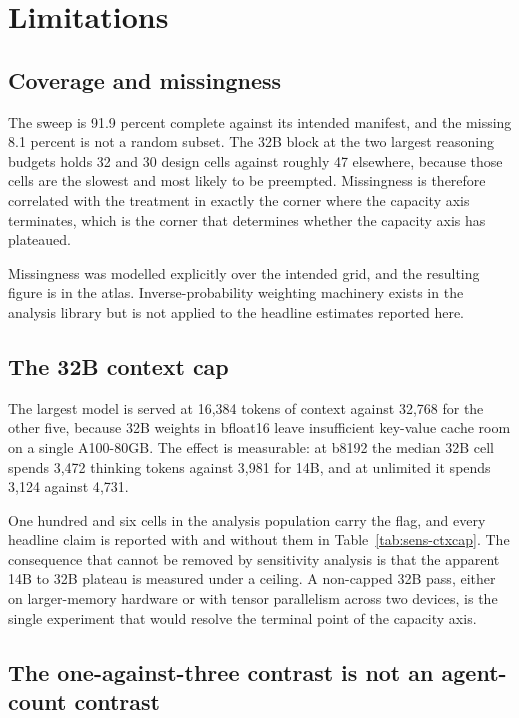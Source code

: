 \section{Limitations}
\label{sec:limitations}

\subsection{Coverage and missingness}

The sweep is 91.9 percent complete against its intended manifest, and the missing 8.1
percent is not a random subset. The 32B block at the two largest reasoning budgets holds 32
and 30 design cells against roughly 47 elsewhere, because those cells are the slowest and
most likely to be preempted. Missingness is therefore correlated with the treatment in
exactly the corner where the capacity axis terminates, which is the corner that determines
whether the capacity axis has plateaued.

Missingness was modelled explicitly over the intended grid, and the resulting figure is in
the atlas. Inverse-probability weighting machinery exists in the analysis library but is not
applied to the headline estimates reported here.

\subsection{The 32B context cap}

The largest model is served at 16{,}384 tokens of context against 32{,}768 for the other
five, because 32B weights in bfloat16 leave insufficient key-value cache room on a single
A100-80GB. The effect is measurable: at b8192 the median 32B cell spends 3{,}472 thinking
tokens against 3{,}981 for 14B, and at unlimited it spends 3{,}124 against 4{,}731.

One hundred and six cells in the analysis population carry the flag, and every headline
claim is reported with and without them in Table~\ref{tab:sens-ctxcap}. The consequence that
cannot be removed by sensitivity analysis is that the apparent 14B to 32B plateau is
measured under a ceiling. A non-capped 32B pass, either on larger-memory hardware or with
tensor parallelism across two devices, is the single experiment that would resolve the
terminal point of the capacity axis.

\subsection{The one-against-three contrast is not an agent-count contrast}

